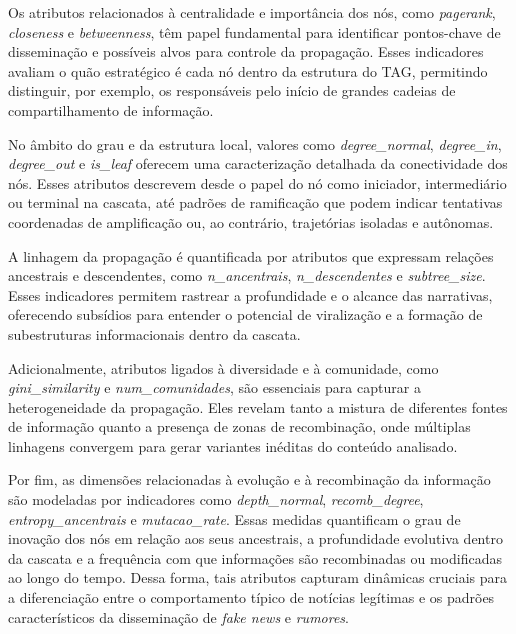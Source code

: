 \documentclass[12pt]{article}
\begin{document}
Os atributos relacionados à centralidade e importância dos nós, como \textit{pagerank}, \textit{closeness} e \textit{betweenness}, têm papel fundamental para identificar pontos-chave de disseminação e possíveis alvos para controle da propagação. Esses indicadores avaliam o quão estratégico é cada nó dentro da estrutura do TAG, permitindo distinguir, por exemplo, os responsáveis pelo início de grandes cadeias de compartilhamento de informação.

No âmbito do grau e da estrutura local, valores como \textit{degree\_normal}, \textit{degree\_in}, \textit{degree\_out} e \textit{is\_leaf} oferecem uma caracterização detalhada da conectividade dos nós. Esses atributos descrevem desde o papel do nó como iniciador, intermediário ou terminal na cascata, até padrões de ramificação que podem indicar tentativas coordenadas de amplificação ou, ao contrário, trajetórias isoladas e autônomas.

A linhagem da propagação é quantificada por atributos que expressam relações ancestrais e descendentes, como \textit{n\_ancentrais}, \textit{n\_descendentes} e \textit{subtree\_size}. Esses indicadores permitem rastrear a profundidade e o alcance das narrativas, oferecendo subsídios para entender o potencial de viralização e a formação de subestruturas informacionais dentro da cascata.

Adicionalmente, atributos ligados à diversidade e à comunidade, como \textit{gini\_similarity} e \textit{num\_comunidades}, são essenciais para capturar a heterogeneidade da propagação. Eles revelam tanto a mistura de diferentes fontes de informação quanto a presença de zonas de recombinação, onde múltiplas linhagens convergem para gerar variantes inéditas do conteúdo analisado.

Por fim, as dimensões relacionadas à evolução e à recombinação da informação são modeladas por indicadores como \textit{depth\_normal}, \textit{recomb\_degree}, \textit{entropy\_ancentrais} e \textit{mutacao\_rate}. Essas medidas quantificam o grau de inovação dos nós em relação aos seus ancestrais, a profundidade evolutiva dentro da cascata e a frequência com que informações são recombinadas ou modificadas ao longo do tempo. Dessa forma, tais atributos capturam dinâmicas cruciais para a diferenciação entre o comportamento típico de notícias legítimas e os padrões característicos da disseminação de \textit{fake news} e \textit{rumores}.
\end{document}

